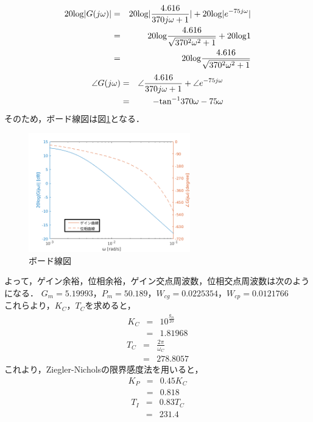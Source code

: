 \documentclass[12pt]{jsarticle}
\begin{document}
\setcounter{page}{5}
\begin{eqnarray}
  20{\rm log}|G(j\omega)| &=& 20{\rm log}|\frac{4.616}{370j\omega+1}| + 20{\rm log}|e^{-75j\omega}| \\ \nonumber
  &=& 20{\rm log}\frac{4.616}{\sqrt{370^2\omega^2+1}} + 20{\rm log}1 \\ \nonumber
  &=& 20{\rm log}\frac{4.616}{\sqrt{370^2\omega^2+1}} \nonumber
\end{eqnarray}
\begin{eqnarray}
  \angle G(j\omega) &=& \angle \frac{4.616}{370j\omega+1} + \angle e^{-75j\omega} \\
  &=& -{\rm tan}^{-1}370\omega - 75\omega
\end{eqnarray}
そのため，ボード線図は図\ref{BodeDiagram}となる．

\begin{figure}[tb]
  \begin{center}
    \includegraphics[clip,width=7.0cm]{../graph/BodeDiagram.png}
    \caption{ボード線図}
    \label{BodeDiagram}
  \end{center}
\end{figure}

よって，ゲイン余裕，位相余裕，ゲイン交点周波数，位相交点周波数は次のようになる．
$G_m=5.19993$，$P_m=50.189$，$W_{cg}=0.0225354$，$W_{cp}=0.0121766$ \\
これらより，$K_C$，$T_C$を求めると，
\begin{eqnarray}
  \label{}
  K_C &=& 10^{\frac{g_m}{20}} \\
  &=& 1.81968
\end{eqnarray}
\begin{eqnarray}
  \label{}
  T_C &=& \frac{2\pi}{\omega_C} \\
  &=& 278.8057
\end{eqnarray}
これより，Ziegler-Nicholsの限界感度法を用いると，
\begin{eqnarray}
  \label{}
  K_P &=& 0.45 K_C \\
  &=& 0.818
\end{eqnarray}
\begin{eqnarray}
  T_I &=& 0.83 T_C \\
  &=& 231.4
\end{eqnarray}
\end{document}

